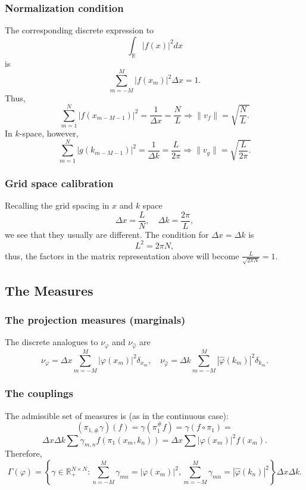 \documentclass[12pt,a4paper]{article}
\begin{document}
\begin{appendices}
\subsubsection{Normalization condition}
The corresponding discrete expression to
\[ \int_{\mathbb{R}} | f (x) |^2 d x \]
is
\[ \sum_{m = - M}^M | f (x_m) |^2 \Delta x = 1. \]
Thus,
\[ \sum_{m = 1}^N | f (x_{m - M - 1}) |^2 = \frac{1}{\Delta x} =
   \frac{N_{}}{L} \Rightarrow \| v_f \| = \sqrt{\frac{N}{L} .} \]
In $k$-space, however,
\[ \sum_{m = 1}^N | g (k_{m - M - 1}) |^2 = \frac{1}{\Delta k} = \frac{L_{}}{2
   \pi} \Rightarrow \| v_g \| = \sqrt{\frac{L}{2 \pi} .} \]
\subsubsection{Grid space calibration}
Recalling the grid spacing in $x$ and $k$ space
\[ \Delta x = \frac{L}{N}, \hspace{1em} \Delta k = \frac{2 \pi}{L}, \]
we see that they usually are different. The condition for $\Delta x = \Delta
k$ is
\[ L^2 = 2 \pi N, \]
thus, the factors in the matrix representation above will become
$\frac{L}{\sqrt{2 \pi N}} = 1$.
\
\
\subsection{The Measures}
\subsubsection{The projection measures (marginals)}
The discrete analogues to $\nu_{\varphi}$ and $\nu_{\hat{\varphi}}$ are
\[ \nu_{\varphi} = \Delta x \sum_{m = - M}^M | \varphi (x_m) |^2 \delta_{x_m},
   \hspace{1em} \nu_{\hat{\varphi}} = \Delta k \sum_{m = - M}^M |
   \hat{\varphi} (k_m) |^2 \delta_{k_m} . \]
\subsubsection{The couplings}
The admissible set of measures is (as in the continuous case):
\[ (\pi_{1, \#} \gamma) (f) = \gamma (\pi_1^{\#} f) = \gamma (f \circ \pi_1) = \]
\[
   \Delta x \Delta k \sum \gamma_{m, n} f (\pi_1 (x_m, k_n)) = \Delta x \sum |
   \varphi (x_m) |^2 f (x_m) . \]
Therefore,
\[ \Gamma (\varphi) = \left\{ \gamma \in \mathbb{R}_+^{N \times N} : \sum_{n
   = - M}^M \gamma_{m n} = | \varphi (x_m) |^2, \sum_{m = - M}^M \gamma_{m n}
   = | \hat{\varphi} (k_n) |^2 \right\} \Delta x \Delta k. \]
\

\end{appendices}
\end{document}
